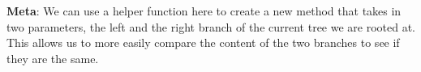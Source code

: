\begin{blocksection}
\begin{solution}
\textbf{Meta}: We can use a helper function here to create a new method that
takes in two parameters, the left and the right branch of the current tree we
are rooted at.  This allows us to more easily compare the content of the two
branches to see if they are the same.
\end{solution}
\end{blocksection}
